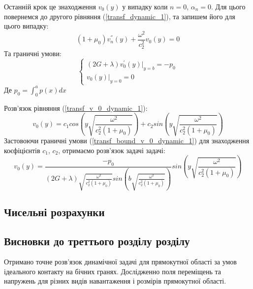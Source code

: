 Останній крок це знаходження $v_0(y)$ у випадку коли $n=0$, $\alpha_n =0$.
Для цього повернемся до другого рівняння (\ref{transf_dynamic_1}), та запишем його для цього випадку:
\begin{equation}\label{transf_v_0_dynamic_1}
    (1 + \mu_0) v_n^{''}(y) + \frac{\omega^2}{c_2^2}v_0(y) = 0
\end{equation}
Та граничні умови:
\begin{equation}\label{transf_bound_v_0_dynamic_1}
    \begin{cases}
        (2G + \lambda)v_0^{'}(y)|_{y=b} = -p_0 \\
        v_0(y)|_{y=0} = 0
    \end{cases}
\end{equation}
Де $p_0 = \int_{0}^{a}p(x)dx$

Розв'язок рівняння (\ref{transf_v_0_dynamic_1}):
\begin{equation}
    v_0(y) = c_1 cos \left(y \sqrt{\frac{\omega^2}{c_2^2(1 + \mu_0)}} \right) + c_2 sin \left( y \sqrt{\frac{\omega^2}{c_2^2(1 + \mu_0)}} \right)
\end{equation}
Застовоючи граничні умови (\ref{transf_bound_v_0_dynamic_1}) для знаходження коєфіцієнтів $c_1$, $c_2$, отримаємо розв'язок задачі задачі:
\begin{equation}
    v_0(y) = \frac{-p_0}{(2G + \lambda) \sqrt{\frac{\omega^2}{c_2^2(1 + \mu_0)}} sin \left(b \sqrt{\frac{\omega^2}{c_2^2(1 + \mu_0)}} \right) } sin \left(y \sqrt{\frac{\omega^2}{c_2^2(1 + \mu_0)}} \right)
\end{equation}

\subsection{Чисельні розрахунки}

\subsection{Висновки до треттього розділу розділу}
Отримано точне розв'язок динамічної задачі для прямокутної області за умов ідеального контакту на бічних гранях.
Дослідженно поля переміщень та напружень для різних видів навантаження і розмірів прямокутної області.